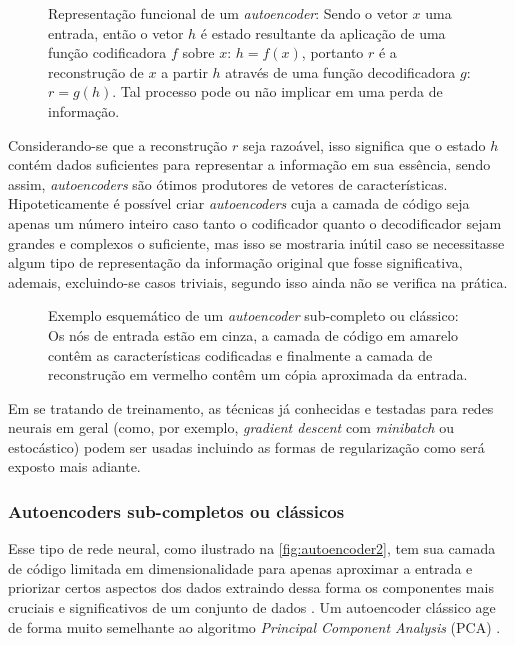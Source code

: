 			\begin{figure}[h]
				\centering
				\caption[Representação funcional de um autoencoder]{Representação funcional de um \textit{autoencoder}: Sendo o vetor $x$ uma entrada, então o vetor $h$ é estado resultante da aplicação de uma função codificadora $f$ sobre $x$: $h = f(x)$, portanto $r$ é a reconstrução de $x$ a partir $h$ através de uma função decodificadora $g$: $r = g(h)$. Tal processo pode ou não implicar em uma perda de informação.}
				
				\label{fig:autoencoder}
			\end{figure}
		
			\par Considerando-se que a reconstrução $r$ seja razoável, isso significa que o estado $h$ contém dados suficientes para representar a informação em sua essência, sendo assim, \textit{autoencoders} são ótimos produtores de vetores de características. Hipoteticamente é possível criar \textit{autoencoders} cuja a camada de código seja apenas um número inteiro caso tanto o codificador quanto o decodificador sejam grandes e complexos o suficiente, mas isso se mostraria inútil caso se necessitasse algum tipo de representação da informação original que fosse significativa, ademais, excluindo-se casos triviais, segundo \cite{Goodfellow-et-al-2016} isso ainda não se verifica na prática.

			\begin{figure}[h]
				\centering
				\caption[Exemplo esquemático de um autoencoder sub-completo]{Exemplo esquemático de um \textit{autoencoder} sub-completo ou clássico: Os nós de entrada estão em cinza, a camada de código em amarelo contêm as características codificadas e finalmente a camada de reconstrução em vermelho contêm um cópia aproximada da entrada.}
				
				\label{fig:autoencoder2}
			\end{figure}

			\par Em se tratando de treinamento, as técnicas já conhecidas e testadas para redes neurais em geral (como, por exemplo, \textit{gradient descent} com \textit{minibatch} ou estocástico) podem ser usadas \cite{Goodfellow-et-al-2016} incluindo as formas de regularização como será exposto mais adiante.
			
			\subsubsection{Autoencoders sub-completos ou clássicos}
				\par Esse tipo de rede neural, como ilustrado na  \autoref{fig:autoencoder2}, tem sua camada de código limitada em dimensionalidade para apenas aproximar a entrada e priorizar certos aspectos dos dados extraindo dessa forma os componentes mais cruciais e significativos de um conjunto de dados \cite{Goodfellow-et-al-2016}. Um autoencoder clássico age de forma muito semelhante ao algoritmo
				\textit{Principal Component Analysis} (PCA) \cite{bengio2014representation}.
				  
